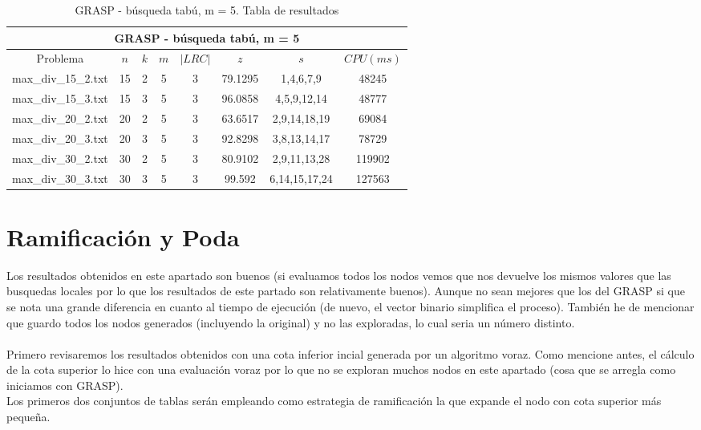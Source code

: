    \begin{table}[h]
   {\small
   \begin{center}
   \begin{tabular}{cccccccc}
      \multicolumn{8}{c}{GRASP - búsqueda tabú, m = 5} \\
      \hline
      Problema & $n$ & $k$ & $m$ & $|LRC|$ & $z$ & $s$ & $CPU(ms)$ \\
      \hline
      max\_div\_15\_2.txt & 15 & 2 & 5 & 3 & 79.1295 & 1,4,6,7,9 & 48245 \\
      max\_div\_15\_3.txt & 15 & 3 & 5 & 3 & 96.0858 & 4,5,9,12,14 & 48777 \\
      max\_div\_20\_2.txt & 20 & 2 & 5 & 3 & 63.6517 & 2,9,14,18,19 & 69084 \\
      max\_div\_20\_3.txt & 20 & 3 & 5 & 3 & 92.8298 & 3,8,13,14,17 & 78729 \\
      max\_div\_30\_2.txt & 30 & 2 & 5 & 3 & 80.9102 & 2,9,11,13,28 & 119902 \\
      max\_div\_30\_3.txt & 30 & 3 & 5 & 3 & 99.592 & 6,14,15,17,24 & 127563 \\
      \hline
   \end{tabular}
   \end{center}
   }
   \caption{GRASP - búsqueda tabú, m = 5. Tabla de resultados}
   \end{table}



\clearpage
\section{Ramificación y Poda}

Los resultados obtenidos en este apartado son buenos (si evaluamos todos los nodos vemos que nos devuelve los mismos valores que las busquedas locales por lo que los resultados de este partado son relativamente buenos). Aunque no sean mejores que los del GRASP si que se nota una grande diferencia en cuanto al tiempo de ejecución (de nuevo, el vector binario simplifica el proceso). También he de mencionar que guardo todos los nodos generados (incluyendo la original) y no las exploradas, lo cual seria un número distinto.
\\
\\
Primero revisaremos los resultados obtenidos con una cota inferior incial generada por un algoritmo voraz. Como mencione antes, el cálculo de la cota superior lo hice con una evaluación voraz por lo que no se exploran muchos nodos en este apartado (cosa que se arregla como iniciamos con GRASP).
\\
Los primeros dos conjuntos de tablas serán empleando como estrategia de ramificación la que expande
el nodo con cota superior más pequeña.

